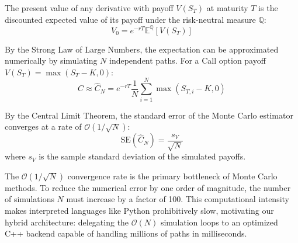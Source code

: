 \begin{theorem}
The present value of any derivative with payoff \(V(S_T)\) at maturity \(T\) is the discounted expected value of its payoff under the risk-neutral measure \(\mathbb{Q}\):
\begin{equation}
    V_0 = e^{-rT} \mathbb{E}^{\mathbb{Q}}[ V(S_T) ]
\end{equation}
\end{theorem}

\begin{proposition}
By the Strong Law of Large Numbers, the expectation can be approximated numerically by simulating \(N\) independent paths. For a Call option payoff \(V(S_T) = \max(S_T - K, 0)\):
\begin{equation}
    C \approx \hat{C}_N = e^{-rT} \frac{1}{N} \sum_{i=1}^{N} \max(S_{T, i} - K, 0)
\end{equation}
\end{proposition}

\begin{proposition}
By the Central Limit Theorem, the standard error of the Monte Carlo estimator converges at a rate of \(\mathcal{O}(1/\sqrt{N})\):
\begin{equation}
    \text{SE}(\hat{C}_N) = \frac{s_V}{\sqrt{N}}
\end{equation}
where \(s_V\) is the sample standard deviation of the simulated payoffs.
\end{proposition}

\begin{remark}
    The \(\mathcal{O}(1/\sqrt{N})\) convergence rate is the primary bottleneck of Monte Carlo methods. To reduce the numerical error by one order of magnitude, the number of simulations \(N\) must increase by a factor of 100. This computational intensity makes interpreted languages like Python prohibitively slow, motivating our hybrid architecture: delegating the \(\mathcal{O}(N)\) simulation loops to an optimized C++ backend capable of handling millions of paths in milliseconds.
\end{remark}
